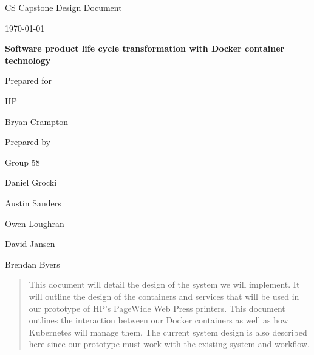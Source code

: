 \documentclass[onecolumn, draftclsnofoot,10pt, compsoc]{IEEEtran}
\def \CapstoneTeamName{		The Cleverly Named Team}
\def \CapstoneTeamNumber{		58}
\def \GroupMemberOne{			Daniel Grocki}
\def \GroupMemberTwo{			Austin Sanders}
\def \GroupMemberThree{			Owen Loughran}
\def \GroupMemberFour{			David Jansen}
\def \GroupMemberFive{			Brendan Byers}
\def \CapstoneProjectName{		Software product life cycle transformation with Docker container technology}
\def \CapstoneSponsorCompany{	HP}
\def \CapstoneSponsorPerson{		Bryan Crampton}
\def \DocType{		%
				Design Document
				}
\newcommand{\NameSigPair}[1]{\par
\makebox[2.75in][r]{#1} \hfil 	\makebox[3.25in]{\makebox[2.25in]{\hrulefill} \hfill		\makebox[.75in]{\hrulefill}}
\par\vspace{-12pt} \textit{\tiny\noindent
\makebox[2.75in]{} \hfil		\makebox[3.25in]{\makebox[2.25in][r]{Signature} \hfill	\makebox[.75in][r]{Date}}}}
\renewcommand{\NameSigPair}[1]{#1}
\begin{document}
\begin{titlepage}
    \begin{singlespace}
        \hfill 
        \par\vspace{.2in}
        \centering
        \scshape{
            \huge CS Capstone \DocType \par
            {\large\today}\par
            \vspace{.5in}
            \textbf{\Huge\CapstoneProjectName}\par
            \vfill
            {\large Prepared for}\par
            \Huge \CapstoneSponsorCompany\par
            \vspace{5pt}
            {\Large\NameSigPair{\CapstoneSponsorPerson}\par}
            {\large Prepared by }\par
            Group\CapstoneTeamNumber\par
            \vspace{5pt}
            {\Large
                \NameSigPair{\GroupMemberOne}\par
                \NameSigPair{\GroupMemberTwo}\par
                \NameSigPair{\GroupMemberThree}\par
                \NameSigPair{\GroupMemberFour}\par
                \NameSigPair{\GroupMemberFive}\par
            }
            \vspace{20pt}
        }
        \begin{abstract}
        This document will detail the design of the system we will implement. It will outline the design of the containers and services that will be used in our prototype of HP's PageWide Web Press printers. This document outlines the interaction between our Docker containers as well as how Kubernetes will manage them. The current system design is also described here since our prototype must work with the existing system and workflow.
        
        \end{abstract}     
    \end{singlespace}
\end{titlepage}
\newpage
{}
\clearpage
\end{document}

